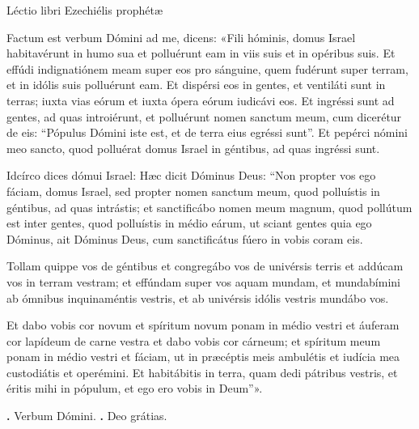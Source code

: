 
Léctio libri Ezechiélis prophétæ

Factum est verbum Dómini ad me, dicens: «Fili hóminis, domus Israel habitavérunt in humo sua et polluérunt eam in viis suis et in opéribus suis.
Et effúdi indignatiónem meam super eos pro sánguine, quem fudérunt super terram, et in idólis suis polluérunt eam.
Et dispérsi eos in gentes, et ventiláti sunt in terras; iuxta vias eórum et iuxta ópera eórum iudicávi eos.
Et ingréssi sunt ad gentes, ad quas introiérunt, et polluérunt nomen sanctum meum, cum dicerétur de eis: “Pópulus Dómini iste est, et de terra eius egréssi sunt”.
Et pepérci nómini meo sancto, quod polluérat domus Israel in géntibus, ad quas ingréssi sunt.

Idcírco dices dómui Israel: Hæc dicit Dóminus Deus: “Non propter vos ego fáciam, domus Israel, sed propter nomen sanctum meum, quod polluístis in géntibus, ad quas intrástis; et sanctificábo nomen meum magnum, quod pollútum est inter gentes, quod polluístis in médio eárum, ut sciant gentes quia ego Dóminus, ait Dóminus Deus, cum sanctificátus fúero in vobis coram eis.

Tollam quippe vos de géntibus et congregábo vos de univérsis terris et addúcam vos in terram vestram; et effúndam super vos aquam mundam, et mundabímini ab ómnibus inquinaméntis vestris, et ab univérsis idólis vestris mundábo vos.

Et dabo vobis cor novum et spíritum novum ponam in médio vestri et áuferam cor lapídeum de carne vestra et dabo vobis cor cárneum; et spíritum meum ponam in médio vestri et fáciam, ut in præcéptis meis ambulétis et iudícia mea custodiátis et operémini. 
Et habitábitis in terra, quam dedi pátribus vestris, et éritis mihi in pópulum, et ego ero vobis in Deum”». 

\textbf{\Vbar.} Verbum Dómini.
\textbf{\Rbar.} Deo grátias.
\par